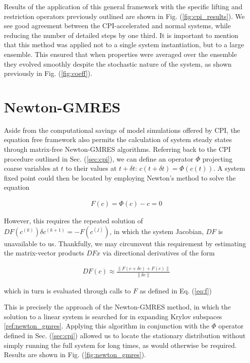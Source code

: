 \documentclass[12pt]{article}
\begin{document}
\begin{onehalfspace}
Results of the application of this general framework with the specific lifting and restriction operators previously outlined are shown in Fig. (\ref{fig:cpi_results}). We see good agreement between the CPI-accelerated and normal systems, while reducing the number of detailed steps by one third. It is important to mention that this method was applied not to a single system instantiation, but to a large ensemble. This ensured that when properties were averaged over the ensemble they evolved smoothly despite the stochastic nature of the system, as shown previously in Fig. (\ref{fig:coeff}).

\section{Newton-GMRES}

Aside from the computational savings of model simulations offered by CPI, the equation free framework also permits the calculation of system steady states through matrix-free Newton-GMRES algorithms. Referring back to the CPI procedure outlined in Sec. (\ref{sec:cpi}), we can define an operator $\Phi$ projecting coarse variables at $t$ to their values at $t + \delta t$: $c(t+\delta t) =\Phi(c(t))$. A system fixed point could then be located by employing Newton's method to solve the equation

\begin{align}
\label{eq:f}
F(c) = \Phi(c) - c = 0
\end{align}

However, this requires the repeated solution of $DF(c^{(k)}) \delta c^{(k+1)} = -F(c^{(j)})$, in which the system Jacobian, $DF$ is unavailable to us. Thankfully, we may circumvent this requirement by estimating the matrix-vector products $DF x$ via directional derivatives of the form

\begin{align}
  DF(c) \approx \frac{\| F(c + \delta c) + F(c) \|}{\|\delta c \|}
\end{align}

which in turn is evaluated through calls to $F$ as defined in Eq. (\ref{eq:f})

This is precisely the approach of the Newton-GMRES method, in which the solution to a linear system is searched for in expanding Krylov subspaces \ref{ref:newton_gmres}. Applying this algorithm in conjunction with the $\Phi$ operator defined in Sec. (\ref{sec:cpi}) allowed us to locate the stationary distribution without simply running the full system for long times, as would otherwise be required. Results are shown in Fig. (\ref{fig:newton_gmres}).


\end{onehalfspace}
\end{document}
